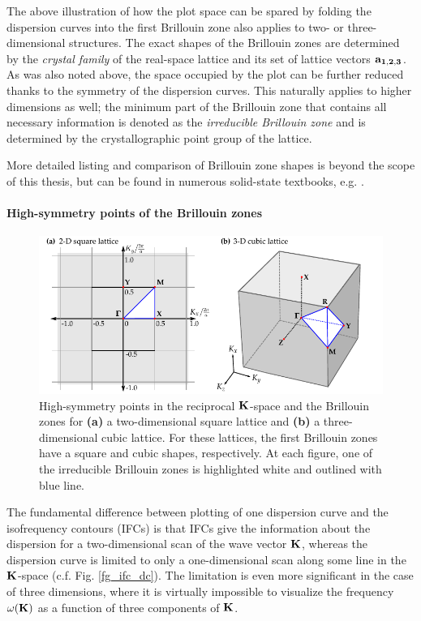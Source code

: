 The above illustration of how the plot space can be spared by folding the dispersion curves into the first Brillouin zone also applies to two- or three-dimensional structures.
The exact shapes of the Brillouin zones are determined by the \textit{crystal family} of the real-space lattice and its set of lattice vectors ${\mathbf{a_{1,2,3}}}$. 
As was also noted above, the space occupied by the plot can be further reduced thanks to the symmetry of the dispersion curves. This naturally applies to higher dimensions as well; the minimum part of the Brillouin zone that contains all necessary information is denoted as the \textit{irreducible Brillouin zone} and is determined by the crystallographic point group of the lattice. 

More detailed listing and comparison of Brillouin zone shapes is beyond the scope of this thesis, but can be found in numerous solid-state textbooks, e.g. \cite[pp. 96-99]{klingshirn2007semiconductor}. 

\paragraph{High-symmetry points of the Brillouin zones} %
\begin{figure}[t] \caption{High-symmetry points in the reciprocal ${\mathbf{K}}$-space and the Brillouin zones for \textbf{(a)} a two-dimensional square lattice and \textbf{(b)} a three-dimensional cubic lattice. For these lattices, the first Brillouin zones have a square and cubic shapes, respectively. At each figure, one of the irreducible Brillouin zones is highlighted white and outlined with blue line.  } \label{fg_phcbrillouin} \centering 
	\includegraphics[width=.9\textwidth]{img/PhC_high_symmetry_points.pdf}
\end{figure}
The fundamental difference between plotting of one dispersion curve and the isofrequency contours (IFCs) is that IFCs give the information about the dispersion for a two-dimensional scan of the wave vector ${\mathbf{K}}$, whereas the dispersion curve is limited to only a one-dimensional scan along some line in the ${\mathbf{K}}$-space (c.f. Fig. \ref{fg_ifc_dc}). The limitation is even more significant in the case of three dimensions, where it is virtually impossible to visualize the frequency $\omega({\mathbf{K}})$ as a function of three components of ${\mathbf{K}}$.


